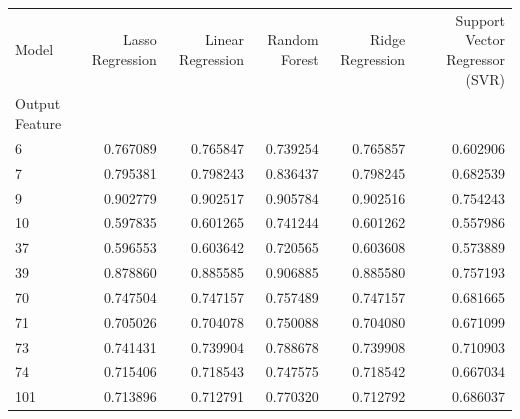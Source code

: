 \begin{tabular}{lrrrrr}
\toprule
Model & Lasso Regression & Linear Regression & Random Forest & Ridge Regression & Support Vector Regressor (SVR) \\
Output Feature &  &  &  &  &  \\
\midrule
6 & 0.767089 & 0.765847 & 0.739254 & 0.765857 & 0.602906 \\
7 & 0.795381 & 0.798243 & 0.836437 & 0.798245 & 0.682539 \\
9 & 0.902779 & 0.902517 & 0.905784 & 0.902516 & 0.754243 \\
10 & 0.597835 & 0.601265 & 0.741244 & 0.601262 & 0.557986 \\
37 & 0.596553 & 0.603642 & 0.720565 & 0.603608 & 0.573889 \\
39 & 0.878860 & 0.885585 & 0.906885 & 0.885580 & 0.757193 \\
70 & 0.747504 & 0.747157 & 0.757489 & 0.747157 & 0.681665 \\
71 & 0.705026 & 0.704078 & 0.750088 & 0.704080 & 0.671099 \\
73 & 0.741431 & 0.739904 & 0.788678 & 0.739908 & 0.710903 \\
74 & 0.715406 & 0.718543 & 0.747575 & 0.718542 & 0.667034 \\
101 & 0.713896 & 0.712791 & 0.770320 & 0.712792 & 0.686037 \\
\bottomrule
\end{tabular}
